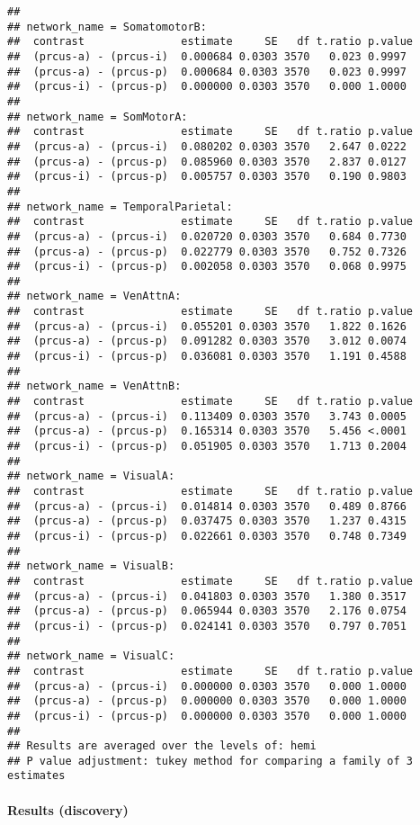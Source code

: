 \documentclass[
]{article}
\begin{document}
\begin{verbatim}
## 
## network_name = SomatomotorB:
##  contrast               estimate     SE   df t.ratio p.value
##  (prcus-a) - (prcus-i)  0.000684 0.0303 3570   0.023 0.9997 
##  (prcus-a) - (prcus-p)  0.000684 0.0303 3570   0.023 0.9997 
##  (prcus-i) - (prcus-p)  0.000000 0.0303 3570   0.000 1.0000 
## 
## network_name = SomMotorA:
##  contrast               estimate     SE   df t.ratio p.value
##  (prcus-a) - (prcus-i)  0.080202 0.0303 3570   2.647 0.0222 
##  (prcus-a) - (prcus-p)  0.085960 0.0303 3570   2.837 0.0127 
##  (prcus-i) - (prcus-p)  0.005757 0.0303 3570   0.190 0.9803 
## 
## network_name = TemporalParietal:
##  contrast               estimate     SE   df t.ratio p.value
##  (prcus-a) - (prcus-i)  0.020720 0.0303 3570   0.684 0.7730 
##  (prcus-a) - (prcus-p)  0.022779 0.0303 3570   0.752 0.7326 
##  (prcus-i) - (prcus-p)  0.002058 0.0303 3570   0.068 0.9975 
## 
## network_name = VenAttnA:
##  contrast               estimate     SE   df t.ratio p.value
##  (prcus-a) - (prcus-i)  0.055201 0.0303 3570   1.822 0.1626 
##  (prcus-a) - (prcus-p)  0.091282 0.0303 3570   3.012 0.0074 
##  (prcus-i) - (prcus-p)  0.036081 0.0303 3570   1.191 0.4588 
## 
## network_name = VenAttnB:
##  contrast               estimate     SE   df t.ratio p.value
##  (prcus-a) - (prcus-i)  0.113409 0.0303 3570   3.743 0.0005 
##  (prcus-a) - (prcus-p)  0.165314 0.0303 3570   5.456 <.0001 
##  (prcus-i) - (prcus-p)  0.051905 0.0303 3570   1.713 0.2004 
## 
## network_name = VisualA:
##  contrast               estimate     SE   df t.ratio p.value
##  (prcus-a) - (prcus-i)  0.014814 0.0303 3570   0.489 0.8766 
##  (prcus-a) - (prcus-p)  0.037475 0.0303 3570   1.237 0.4315 
##  (prcus-i) - (prcus-p)  0.022661 0.0303 3570   0.748 0.7349 
## 
## network_name = VisualB:
##  contrast               estimate     SE   df t.ratio p.value
##  (prcus-a) - (prcus-i)  0.041803 0.0303 3570   1.380 0.3517 
##  (prcus-a) - (prcus-p)  0.065944 0.0303 3570   2.176 0.0754 
##  (prcus-i) - (prcus-p)  0.024141 0.0303 3570   0.797 0.7051 
## 
## network_name = VisualC:
##  contrast               estimate     SE   df t.ratio p.value
##  (prcus-a) - (prcus-i)  0.000000 0.0303 3570   0.000 1.0000 
##  (prcus-a) - (prcus-p)  0.000000 0.0303 3570   0.000 1.0000 
##  (prcus-i) - (prcus-p)  0.000000 0.0303 3570   0.000 1.0000 
## 
## Results are averaged over the levels of: hemi 
## P value adjustment: tukey method for comparing a family of 3 estimates
\end{verbatim}

\hypertarget{results-discovery-1}{%
\paragraph{Results (discovery)}\label{results-discovery-1}}
\end{document}
